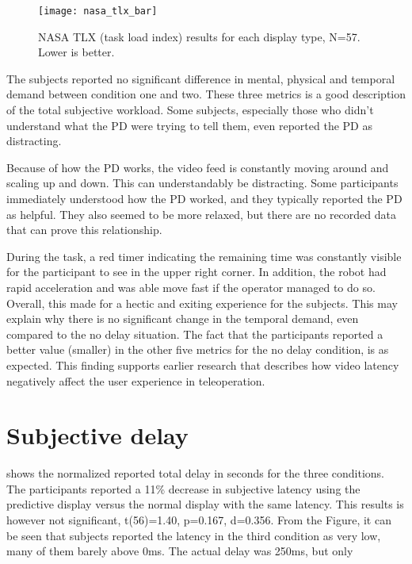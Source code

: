 \begin{figure}[h!]
    \centering
    \texttt{[image: nasa\_tlx\_bar]}
    \vspace{-2mm}
    \caption{NASA TLX (task load index) results for each display type, N=57. Lower is better.}
    \vspace{-3mm}
    \label{tlx}
\end{figure}

The subjects reported no significant difference in mental, physical and temporal demand between condition one and two. These three metrics is a good description of the total subjective workload. Some subjects, especially those who didn't understand what the PD were trying to tell them, even reported the PD as distracting.

\restoregeometry

Because of how the PD works, the video feed is constantly moving around and scaling up and down. This can understandably be distracting. Some participants immediately understood how the PD worked, and they typically reported the PD as helpful. They also seemed to be more relaxed, but there are no recorded data that can prove this relationship.



During the task, a red timer indicating the remaining time was constantly visible for the participant to see in the upper right corner. In addition, the robot had rapid acceleration and was able move fast if the operator managed to do so. Overall, this made for a hectic and exiting experience for the subjects. This may explain why there is no significant change in the temporal demand, even compared to the no delay situation. The fact that the participants reported a better value (smaller) in the other five metrics for the no delay condition, is as expected. This finding supports earlier research that describes how video latency negatively affect the user experience in teleoperation.

\clearpage
\section{Subjective delay}

 shows the normalized reported total delay in seconds for the three conditions. The participants reported a 11\% decrease in subjective latency using the predictive display versus the normal display with the same latency. This results is however not significant, t(56)=1.40, p=0.167, d=0.356. From the Figure, it can be seen that subjects reported the latency in the third condition as very low, many of them barely above 0ms. The actual delay was 250ms, but only

